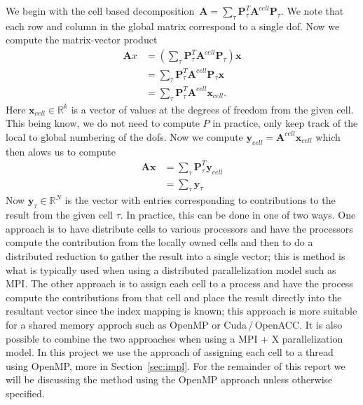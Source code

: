 \documentclass[12pt]{article}
\newcommand{\vect}[1]{\boldsymbol{\mathbf{#1}}}
\begin{document}
We begin with the cell based decomposition~$\mathbf{A} = \sum_{\tau}\vect P^{T}_{\tau}\mathbf{A}^{cell}\vect P_{\tau} $. We note that each row and column in the global matrix correspond to a single dof. Now we compute the matrix-vector product
\begin{align*}
\mathbf{A}x &= \left(\sum_{\tau}\vect P^{T}_{\tau}\mathbf{A}^{cell}\vect P_{\tau} \right)\vect x \\
				&= \sum_{\tau}\vect P^{T}_{\tau}\mathbf{A}^{cell}\vect P_{\tau}\vect x \\
				&= \sum_{\tau}\vect P^{T}_{\tau}\mathbf{A}^{cell}\vect x_{cell}.
\end{align*}
Here $\vect x_{cell} \in \mathbb{R}^{k}$ is a vector of values at the degrees of freedom from the given cell. This being know, we do not need to compute $P$ in practice, only keep track of the local to global numbering of the dofs. Now we compute $\vect y_{cell} = \mathbf{A}^{cell}\vect x_{cell}$ which then alows us to compute
\begin{align*}
\mathbf{A}\vect x &= \sum_{\tau}\vect P^{T}_{\tau}\vect y_{cell} \\
				&= \sum_{\tau} \vect y_{\tau}
\end{align*}
Now $\vect y_{\tau} \in \mathbb{R}^{N}$ is the vector with entries corresponding to contributions to the result from the given cell $\tau$. In practice, this can be done in one of two ways. One approach is to have distribute cells to various processors and have the processors compute the contribution from the locally owned cells and then to do a distributed reduction to gather the result into a single vector; this is method is what is typically used when using a distributed parallelization model such as MPI. The other approach is to assign each cell to a process and have the process compute the contributions from that cell and place the result directly into the resultant vector since the index mapping is known; this approach is more suitable for a shared memory approch such as OpenMP or Cuda\,/\,OpenACC. It is also possible to combine the two approaches when using a MPI + X parallelization model. In this project we use the approach of assigning each cell to a thread using OpenMP, more in Section~\ref{sec:impl}. For the remainder of this report we will be discussing the method using the OpenMP approach unless otherwise specified.
\end{document}
